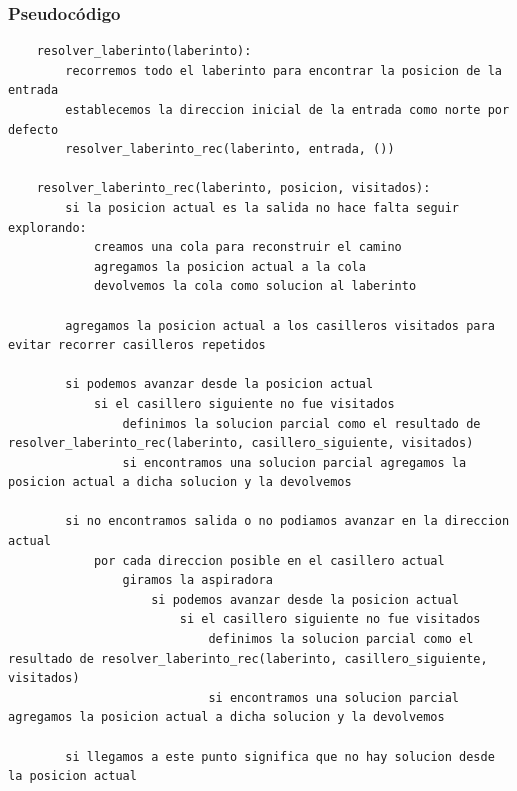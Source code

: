 \subsubsection{Pseudocódigo}
\begin{verbatim}
    resolver_laberinto(laberinto):
        recorremos todo el laberinto para encontrar la posicion de la entrada
        establecemos la direccion inicial de la entrada como norte por defecto
        resolver_laberinto_rec(laberinto, entrada, ())

    resolver_laberinto_rec(laberinto, posicion, visitados):
        si la posicion actual es la salida no hace falta seguir explorando:
            creamos una cola para reconstruir el camino
            agregamos la posicion actual a la cola
            devolvemos la cola como solucion al laberinto

        agregamos la posicion actual a los casilleros visitados para evitar recorrer casilleros repetidos

        si podemos avanzar desde la posicion actual
            si el casillero siguiente no fue visitados
                definimos la solucion parcial como el resultado de resolver_laberinto_rec(laberinto, casillero_siguiente, visitados)
                si encontramos una solucion parcial agregamos la posicion actual a dicha solucion y la devolvemos

        si no encontramos salida o no podiamos avanzar en la direccion actual
            por cada direccion posible en el casillero actual
                giramos la aspiradora
                    si podemos avanzar desde la posicion actual
                        si el casillero siguiente no fue visitados
                            definimos la solucion parcial como el resultado de resolver_laberinto_rec(laberinto, casillero_siguiente, visitados)
                            si encontramos una solucion parcial agregamos la posicion actual a dicha solucion y la devolvemos

        si llegamos a este punto significa que no hay solucion desde la posicion actual
        
\end{verbatim}


